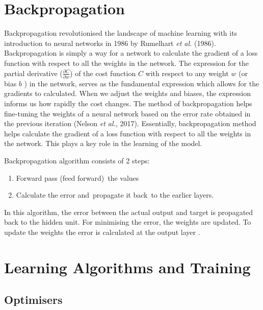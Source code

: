 
\section{Backpropagation}

Backpropagation revolutionised the landscape of machine learning with its introduction to neural networks in 1986 by Rumelhart \textit{et al.} (1986). Backpropagation is simply a way for a network to calculate the gradient of a loss function with respect to all the weights in the network. 
The expression for the partial derivative ($\frac{\partial C}{ \partial w}$) of the cost function $C$ with respect to any weight $w$ (or bias $b$ ) in the network, serves as the fundamental expression which allows for the gradients to calculated. When we adjust the weights and biases, the expression informs us how rapidly the cost changes. The method of backpropagation helps fine-tuning the weights of a neural network based on the error rate obtained in the previous iteration (Nelson \textit{et al.}, 2017).  Essentially, backpropagation method helps calculate the gradient of a loss function with respect to all the weights in the network. This plays a key role in the learning of the model. 

Backpropagation algorithm consists of 2 steps: 
\begin{enumerate}
\item Forward pass (feed forward) the values
\item Calculate the error and propagate it back to the earlier layers. 
\end{enumerate}

In this algorithm, the error between the actual output and target is propagated back to the hidden unit. For minimising the error, the weights are updated. To update the weights the error is calculated at the output layer . 

\section{Learning Algorithms and Training}

\subsection{Optimisers}

